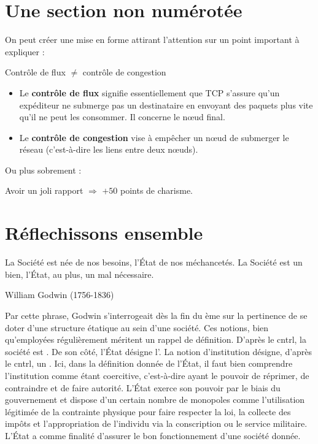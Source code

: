 \section*{Une section non numérotée}
On peut créer une mise en forme attirant l'attention sur un point important à expliquer :

\begin{callout}{Contrôle de flux $\neq$ contrôle de congestion}
    \begin{itemize}
        \item Le \textbf{contrôle de flux} signifie essentiellement que TCP s'assure qu'un expéditeur ne submerge pas un destinataire en envoyant des paquets plus vite qu'il ne peut les consommer. Il concerne le nœud final.
        \item Le \textbf{contrôle de congestion} vise à empêcher un nœud de submerger le réseau (c'est-à-dire les liens entre deux nœuds).
    \end{itemize}
\end{callout}

Ou plus sobrement :

\begin{myboxedtext}
    Avoir un joli rapport $\Rightarrow$ $+50$ points de charisme.
\end{myboxedtext}

\section{Réflechissons ensemble}
\epigraph{La Société est née de nos besoins, l'État de nos méchancetés. La Société est un bien, l'État, au plus, un mal nécessaire.}{William Godwin (1756-1836)}
Par cette phrase, Godwin s'interrogeait dès la fin du ème sur la pertinence de se doter
d'une structure étatique au sein d'une société. Ces notions, bien qu'employées régulièrement
méritent un rappel de définition. D'après le cntrl, la société est . De son côté, l'État  désigne l’. La notion d'institution désigne, d'après le cntrl, un
. Ici, dans la définition donnée de l'État, il faut bien
comprendre l'institution comme étant coercitive, c'est-à-dire ayant le pouvoir de réprimer, de
contraindre et de faire autorité. L'État exerce son pouvoir par le biais du gouvernement et dispose
d'un certain nombre de monopoles comme l'utilisation légitimée de la contrainte physique pour faire
respecter la loi, la collecte des impôts et l'appropriation de l'individu via la conscription ou le
service militaire. L'État a comme finalité d’assurer le bon fonctionnement d’une société donnée.

